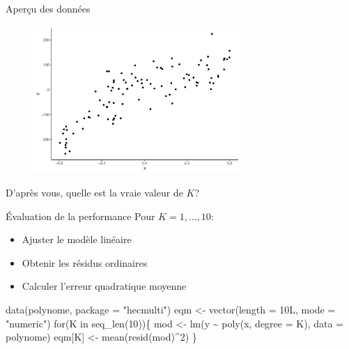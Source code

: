 \documentclass[
  ignorenonframetext,
]{beamer}
\newenvironment{Shaded}{\begin{snugshade}}{\end{snugshade}}
\newcommand{\AttributeTok}[1]{\textcolor[rgb]{0.40,0.45,0.13}{#1}}
\newcommand{\ControlFlowTok}[1]{\textcolor[rgb]{0.00,0.23,0.31}{#1}}
\newcommand{\DecValTok}[1]{\textcolor[rgb]{0.68,0.00,0.00}{#1}}
\newcommand{\FunctionTok}[1]{\textcolor[rgb]{0.28,0.35,0.67}{#1}}
\newcommand{\NormalTok}[1]{\textcolor[rgb]{0.00,0.23,0.31}{#1}}
\newcommand{\OtherTok}[1]{\textcolor[rgb]{0.00,0.23,0.31}{#1}}
\newcommand{\SpecialCharTok}[1]{\textcolor[rgb]{0.37,0.37,0.37}{#1}}
\newcommand{\StringTok}[1]{\textcolor[rgb]{0.13,0.47,0.30}{#1}}
\providecommand{\tightlist}{%
  \setlength{\itemsep}{0pt}\setlength{\parskip}{0pt}}\usepackage{longtable,booktabs,array}
\begin{document}
\begin{frame}{Aperçu des données}
\protect\hypertarget{aperuxe7u-des-donnuxe9es}{}
\begin{figure}

{\centering \includegraphics[width=0.7\textwidth,height=\textheight]{MATH60602-diapos4_files/figure-beamer/unnamed-chunk-5-1.pdf}

}

\end{figure}

D'après vous, quelle est la vraie valeur de \(K\)?
\end{frame}

\begin{frame}[fragile]{Évaluation de la performance}
\protect\hypertarget{uxe9valuation-de-la-performance}{}
Pour \(K=1, \ldots, 10\):

\begin{itemize}
\tightlist
\item
  Ajuster le modèle linéaire
\item
  Obtenir les résidus ordinaires
\item
  Calculer l'erreur quadratique moyenne
\end{itemize}

\begin{Shaded}
\begin{Highlighting}[numbers=left,,]
\FunctionTok{data}\NormalTok{(polynome, }\AttributeTok{package =} \StringTok{"hecmulti"}\NormalTok{)}
\NormalTok{eqm }\OtherTok{\textless{}{-}} \FunctionTok{vector}\NormalTok{(}\AttributeTok{length =}\NormalTok{ 10L, }\AttributeTok{mode =} \StringTok{"numeric"}\NormalTok{)}
\ControlFlowTok{for}\NormalTok{(K }\ControlFlowTok{in} \FunctionTok{seq\_len}\NormalTok{(}\DecValTok{10}\NormalTok{))\{}
\NormalTok{ mod }\OtherTok{\textless{}{-}} \FunctionTok{lm}\NormalTok{(y }\SpecialCharTok{\textasciitilde{}} \FunctionTok{poly}\NormalTok{(x, }\AttributeTok{degree =}\NormalTok{ K), }\AttributeTok{data =}\NormalTok{ polynome)}
\NormalTok{ eqm[K] }\OtherTok{\textless{}{-}} \FunctionTok{mean}\NormalTok{(}\FunctionTok{resid}\NormalTok{(mod)}\SpecialCharTok{\^{}}\DecValTok{2}\NormalTok{)}
\NormalTok{\}}
\end{Highlighting}
\end{Shaded}
\end{frame}
\end{document}
